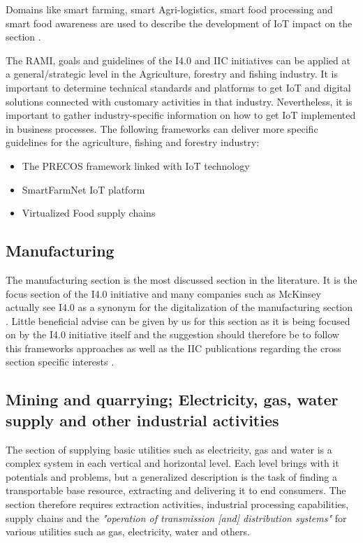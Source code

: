Domains like smart farming, smart Agri-logistics, smart food processing and smart food awareness are used to describe the development of \ac{IoT} impact on the section \cite[p.133]{FoodAndFarm2020}.

The \ac{RAMI}, goals and guidelines of the \ac{I4.0} and \ac{IIC} initiatives can be applied at a general/strategic level in the Agriculture, forestry and fishing industry. It is important to determine technical standards and platforms to get \ac{IoT} and digital solutions connected with customary activities in that industry. Nevertheless, it is important to gather industry-specific information on how to get \ac{IoT} implemented in business processes.
The following frameworks can deliver more specific guidelines for the agriculture, fishing and forestry industry:

\begin{itemize}
\item The PRECOS framework linked with \ac{IoT} technology \cite{Trolard2016590}
\item SmartFarmNet \ac{IoT} platform \cite{InternetOfThingsAgricultureSmartFarming}
\item Virtualized Food supply chains \cite{Verdouw2016128}
\end{itemize}


\subsection{Manufacturing}
The manufacturing section is the most discussed section in the literature. It is the focus section of the \ac{I4.0} initiative and many companies such as McKinsey actually see \ac{I4.0} as a synonym for the digitalization of the manufacturing section \cite[]{McKinseydigitizationIndustrialSector:2015}. Little beneficial advise can be given by us for this section as it is being focused on by the \ac{I4.0} initiative itself and the suggestion should therefore be to follow this frameworks approaches as well as the \ac{IIC} publications regarding the cross section specific interests \cite[]{iicarchitecture:2016}.

\subsection{Mining and quarrying; Electricity, gas, water supply and other industrial activities }

The section of supplying basic utilities such as electricity, gas and water is a complex system in each vertical and horizontal level. Each level brings with it potentials and problems, but a generalized description is the task of finding a transportable base resource, extracting and delivering it to end consumers. The section therefore requires extraction activities, industrial processing capabilities, supply chains and the \emph{"operation of transmission [and] distribution systems"}\cite[p. 166ff]{ISIC:2008} for various utilities such as gas, electricity, water and others.


